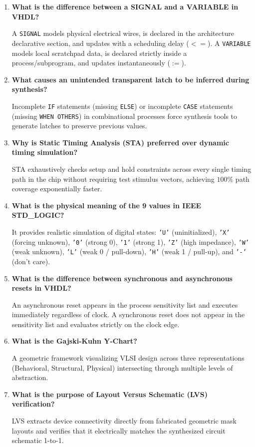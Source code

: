 \documentclass[12pt,a4paper]{article}
\newcommand{\Q}[1]{\textbf{#1}\par\noindent\ignorespaces}
\begin{document}
\begin{tcolorbox}[exambox, title={\textbf{Frequently Asked / Viva Questions}}]
\begin{enumerate}[topsep=0pt, label=\textbf{Q\arabic*.}, itemsep=5pt]
  \item \Q{What is the difference between a SIGNAL and a VARIABLE in VHDL?}
  A \texttt{SIGNAL} models physical electrical wires, is declared in the architecture declarative section, and updates with a scheduling delay ($<=$). A \texttt{VARIABLE} models local scratchpad data, is declared strictly inside a process/subprogram, and updates instantaneously ($:=$).

  \item \Q{What causes an unintended transparent latch to be inferred during synthesis?}
  Incomplete \texttt{IF} statements (missing \texttt{ELSE}) or incomplete \texttt{CASE} statements (missing \texttt{WHEN OTHERS}) in combinational processes force synthesis tools to generate latches to preserve previous values.

  \item \Q{Why is Static Timing Analysis (STA) preferred over dynamic timing simulation?}
  STA exhaustively checks setup and hold constraints across every single timing path in the chip without requiring test stimulus vectors, achieving $100\%$ path coverage exponentially faster.

  \item \Q{What is the physical meaning of the 9 values in IEEE STD\_LOGIC?}
  It provides realistic simulation of digital states: \texttt{'U'} (uninitialized), \texttt{'X'} (forcing unknown), \texttt{'0'} (strong 0), \texttt{'1'} (strong 1), \texttt{'Z'} (high impedance), \texttt{'W'} (weak unknown), \texttt{'L'} (weak 0 / pull-down), \texttt{'H'} (weak 1 / pull-up), and \texttt{'-'} (don't care).

  \item \Q{What is the difference between synchronous and asynchronous resets in VHDL?}
  An asynchronous reset appears in the process sensitivity list and executes immediately regardless of clock. A synchronous reset does not appear in the sensitivity list and evaluates strictly on the clock edge.

  \item \Q{What is the Gajski-Kuhn Y-Chart?}
  A geometric framework visualizing VLSI design across three representations (Behavioral, Structural, Physical) intersecting through multiple levels of abstraction.

  \item \Q{What is the purpose of Layout Versus Schematic (LVS) verification?}
  LVS extracts device connectivity directly from fabricated geometric mask layouts and verifies that it electrically matches the synthesized circuit schematic 1-to-1.


\end{enumerate}
\end{tcolorbox}
\end{document}

